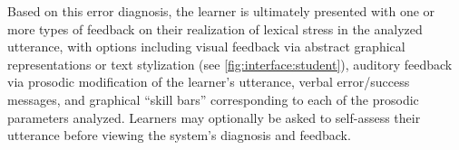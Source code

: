\documentclass[a4paper]{article}
\begin{document}
 Based on this error diagnosis, the learner is ultimately presented with one or more types of feedback on their realization of lexical stress in the analyzed utterance, with options including visual feedback via abstract graphical representations or text stylization (see \cref{fig:interface:student}), auditory feedback via prosodic modification of the learner's utterance, verbal error/success messages, and graphical ``skill bars'' corresponding to each of the prosodic parameters analyzed.  Learners may optionally be asked to self-assess their utterance before viewing the system's diagnosis and feedback.
\end{document}
